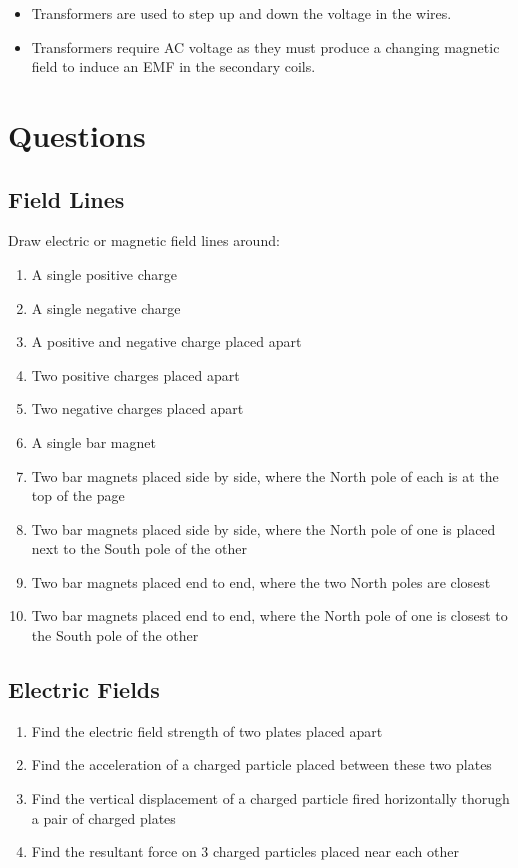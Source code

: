 \documentclass[a4paper,11pt]{article}
\begin{document}
\begin{itemize}
\item Transformers are used to step up and down the voltage in the wires.
\item Transformers require AC voltage as they must produce a changing magnetic
	field to induce an EMF in the secondary coils.
\end{itemize}




\section{Questions}

\subsection{Field Lines}

Draw electric or magnetic field lines around:

\begin{enumerate}
\item A single positive charge
\item A single negative charge
\item A positive and negative charge placed apart
\item Two positive charges placed apart
\item Two negative charges placed apart
\item A single bar magnet
\item Two bar magnets placed side by side, where the North pole of each is at
	the top of the page
\item Two bar magnets placed side by side, where the North pole of one is placed
	next to the South pole of the other
\item Two bar magnets placed end to end, where the two North poles are closest
\item Two bar magnets placed end to end, where the North pole of one is closest
	to the South pole of the other
\end{enumerate}


\subsection{Electric Fields}

\begin{enumerate}
\item Find the electric field strength of two plates placed apart
\item Find the acceleration of a charged particle placed between these two
	plates
\item Find the vertical displacement of a charged particle fired horizontally
	thorugh a pair of charged plates
\item Find the resultant force on 3 charged particles placed near each other
\end{enumerate}
\end{document}
